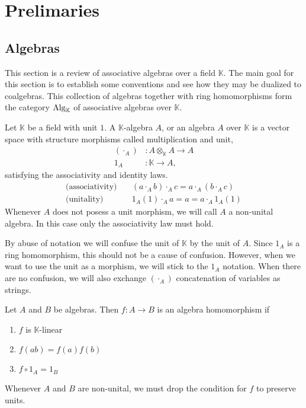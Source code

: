 \documentclass[../thesis.tex]{subfiles}
\begin{document}
    \section{Prelimaries}    
    \subsection{Algebras}

            This section is a review of associative algebras over a field $\mathbb{K}$. The main goal for this section is to establish some conventions and see how they may be dualized to coalgebras. This collection of algebras together with ring homomorphisms form the category $\tt{Alg}_{\mathbb{K}}$ of associative algebras over $\mathbb{K}$.

            \begin{definition}
                Let $\mathbb{K}$ be a field with unit $1$. A $\mathbb{K}$-algebra $A$, or an algebra $A$ over $\mathbb{K}$ is a vector space with structure morphisms called multiplication and unit,
                \begin{align*}
                    (\cdot_A) & : A\otimes_{\mathbb{K}}A \rightarrow A \\
                    1_A & : \mathbb{K} \rightarrow A,
                \end{align*}
                satisfying the associativity and identity laws. 
                \begin{align*}
                    \text{(associativity)}\quad & (a \cdot_A b) \cdot_A c = a \cdot_A (b \cdot_A c) \\
                    \text{(unitality)}\quad & 1_A(1) \cdot_A a = a = a \cdot_A 1_A(1)
                \end{align*}
                Whenever $A$ does not posess a unit morphism, we will call $A$ a non-unital algebra. In this case only the associativity law must hold.
            \end{definition}

            By abuse of notation we will confuse the unit of $\mathbb{K}$ by the unit of $A$. Since $1_A$ is a ring homomorphism, this should not be a cause of confusion. However, when we want to use the unit as a morphism, we will stick to the $1_A$ notation. When there are no confusion, we will also exchange $(\cdot_A)$ concatenation of variables as strings. 

            \begin{definition}
                Let $A$ and $B$ be algebras. Then $f: A\rightarrow B$ is an algebra homomorphism if
                \begin{enumerate}
                    \item $f$ is $\mathbb{K}$-linear
                    \item $f(ab)=f(a)f(b)$
                    \item $f\circ 1_A = 1_B$
                \end{enumerate}
                Whenever $A$ and $B$ are non-unital, we must drop the condition for $f$ to preserve units.
            \end{definition}
\end{document}
